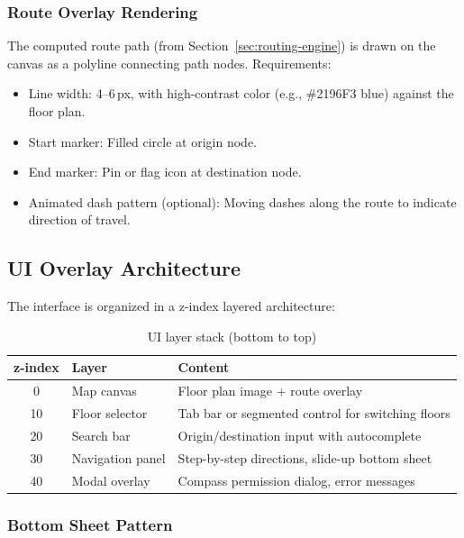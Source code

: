 \subsubsection{Route Overlay Rendering}

The computed route path (from Section~\ref{sec:routing-engine}) is drawn on the canvas as a polyline connecting path nodes. Requirements:

\begin{itemize}
  \item Line width: 4--6\,px, with high-contrast color (e.g., \#2196F3 blue) against the floor plan.
  \item Start marker: Filled circle at origin node.
  \item End marker: Pin or flag icon at destination node.
  \item Animated dash pattern (optional): Moving dashes along the route to indicate direction of travel.
\end{itemize}

\subsection{UI Overlay Architecture}

The interface is organized in a z-index layered architecture:

\begin{table}[H]
\centering
\caption{UI layer stack (bottom to top)}
\begin{tabular}{clp{6cm}}
\toprule
\textbf{z-index} & \textbf{Layer} & \textbf{Content} \\
\midrule
0 & Map canvas & Floor plan image + route overlay \\
10 & Floor selector & Tab bar or segmented control for switching floors \\
20 & Search bar & Origin/destination input with autocomplete \\
30 & Navigation panel & Step-by-step directions, slide-up bottom sheet \\
40 & Modal overlay & Compass permission dialog, error messages \\
\bottomrule
\end{tabular}
\end{table}

\subsubsection{Bottom Sheet Pattern}


